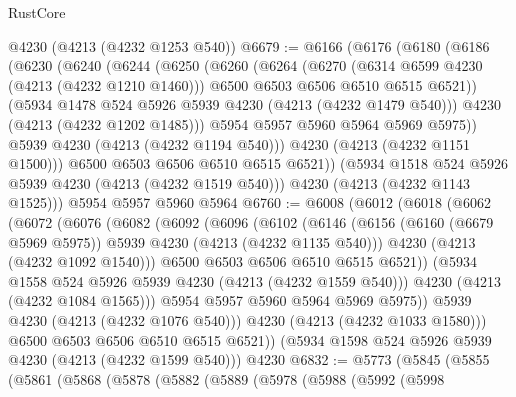 \begin{lexlean}{RustCore}
\begin{coremodule}
    @4230
    (@4213 (@4232 @1253 @540))
@6679 := @6166
    (@6176
      (@6180
        (@6186
          (@6230
            (@6240
              (@6244
                (@6250
                  (@6260
                    (@6264
                      (@6270
                        (@6314 @6599 @4230 (@4213 (@4232 @1210 @1460)))
                        @6500
                        @6503
                        @6506
                        @6510
                        @6515
                        @6521))
                    (@5934 @1478 @524 @5926 @5939 @4230 (@4213 (@4232 @1479 @540)))
                    @4230
                    (@4213 (@4232 @1202 @1485)))
                  @5954
                  @5957
                  @5960
                  @5964
                  @5969
                  @5975))
              @5939
              @4230
              (@4213 (@4232 @1194 @540)))
            @4230
            (@4213 (@4232 @1151 @1500)))
          @6500
          @6503
          @6506
          @6510
          @6515
          @6521))
      (@5934 @1518 @524 @5926 @5939 @4230 (@4213 (@4232 @1519 @540)))
      @4230
      (@4213 (@4232 @1143 @1525)))
    @5954
    @5957
    @5960
    @5964
@6760 := @6008
    (@6012
      (@6018
        (@6062
          (@6072
            (@6076
              (@6082
                (@6092
                  (@6096
                    (@6102
                      (@6146
                        (@6156 (@6160 (@6679 @5969 @5975)) @5939 @4230 (@4213 (@4232 @1135 @540)))
                        @4230
                        (@4213 (@4232 @1092 @1540)))
                      @6500
                      @6503
                      @6506
                      @6510
                      @6515
                      @6521))
                  (@5934 @1558 @524 @5926 @5939 @4230 (@4213 (@4232 @1559 @540)))
                  @4230
                  (@4213 (@4232 @1084 @1565)))
                @5954
                @5957
                @5960
                @5964
                @5969
                @5975))
            @5939
            @4230
            (@4213 (@4232 @1076 @540)))
          @4230
          (@4213 (@4232 @1033 @1580)))
        @6500
        @6503
        @6506
        @6510
        @6515
        @6521))
    (@5934 @1598 @524 @5926 @5939 @4230 (@4213 (@4232 @1599 @540)))
    @4230
@6832 := @5773
    (@5845
      (@5855
        (@5861
          (@5868
            (@5878
              (@5882
                (@5889
                  (@5978
                    (@5988
                      (@5992
                        (@5998

\end{coremodule}
\end{lexlean}
